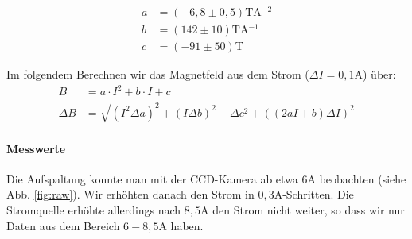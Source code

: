 \begin{align*}
a &= \si{(-6,8 \pm 0,5)\tesla\ampere^{-2}}\\
b &= \si{(142 \pm 10) \tesla\ampere^{-1}}\\
c &= \si{(-91 \pm 50)\tesla}
\end{align*}

Im folgendem Berechnen wir das Magnetfeld aus dem Strom ($\Delta I = \si{0,1 \ampere}$) über:
\begin{align*}
B &= a\cdot I^2 + b \cdot I + c\\
\Delta B &= \sqrt{(I^2\Delta a)^2 + (I \Delta b)^2 + \Delta c^2 + ((2aI+b)\Delta I)^2}
\end{align*}

\paragraph{Messwerte}
Die Aufspaltung konnte man mit der CCD-Kamera ab etwa $6\si{\ampere}$ beobachten (siehe Abb. \ref{fig:raw}). Wir erhöhten danach den Strom in $0,3\si{\ampere}$-Schritten. Die Stromquelle erhöhte allerdings nach $8,5\si{\ampere}$ den Strom nicht weiter, so dass wir nur Daten aus dem Bereich $6-8,5\si{\ampere}$ haben.
